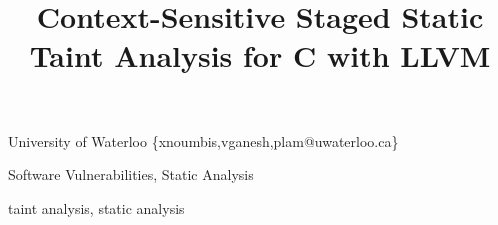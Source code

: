 \documentclass{sigplanconf}
\begin{document}


\title{Context-Sensitive Staged Static Taint Analysis for C with LLVM}

\date{}

           {University of Waterloo}
           {\{xnoumbis,vganesh,plam@uwaterloo.ca\}}

\maketitle




\terms
Software Vulnerabilities, Static Analysis

\keywords
taint analysis, static analysis















\appendix












\end{document}
